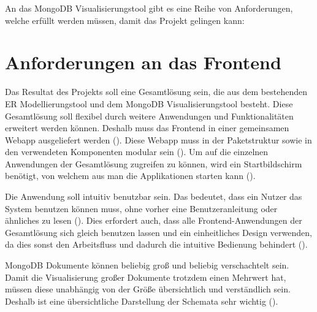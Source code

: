 \iffalse
Die Analyse des zu lösenden Problems ist Grundlage für jedes 
ingenieurmäßige Vorgehen. Daher soll in diesem Kapitel das zu lösenden 
Problem auf Basis des im Grundlagenkapitel aufbereiteten Wissens 
analysiert werden. Hierzu ist insbesondere notwendig zu klären, wie sich 
das Gesamtproblem in Teilprobleme zerlegen lässt und welche 
Abhängigkeiten zwischen diesen bestehen.

Bei Software-Projekten befindet sich an dieser Stelle typischerweise die 
Anforderungsanalyse des \ac{rup}.

Anforderungen:
\begin{itemize}
    \item modular
    \item erweiterbar
    \item performant
\end{itemize}

\fi



An das MongoDB Visualisierungstool gibt es eine Reihe von Anforderungen, welche erfüllt werden müssen, damit das Projekt gelingen kann:

\section{Anforderungen an das Frontend}
\label{sec:anf_frontend}

Das Resultat des Projekts soll eine Gesamtlösung sein, die aus dem bestehenden ER Modellierungstool und dem MongoDB Visualisierungstool besteht. 
Diese Gesamtlösung soll flexibel durch weitere Anwendungen und Funktionalitäten erweitert werden können.
Deshalb muss das Frontend in einer gemeinsamen Webapp ausgeliefert werden ().
Diese Webapp muss in der Paketstruktur sowie in den verwendeten Komponenten modular sein ().
Um auf die einzelnen Anwendungen der Gesamtlösung zugreifen zu können, wird ein Startbildschirm benötigt, von welchem aus man die Applikationen starten kann (). 

Die Anwendung soll intuitiv benutzbar sein.
Das bedeutet, dass ein Nutzer das System benutzen können muss, ohne vorher eine Benutzeranleitung oder ähnliches zu lesen ().
Dies erfordert auch, dass alle Frontend-Anwendungen der Gesamtlösung sich gleich benutzen lassen und ein einheitliches Design verwenden, da dies sonst den Arbeitsfluss und dadurch die intuitive Bedienung behindert ().

MongoDB Dokumente können beliebig groß und beliebig verschachtelt sein.
Damit die Visualisierung großer Dokumente trotzdem einen Mehrwert hat, müssen diese unabhängig von der Größe übersichtlich und verständlich sein.
Deshalb ist eine übersichtliche Darstellung der Schemata sehr wichtig ().

